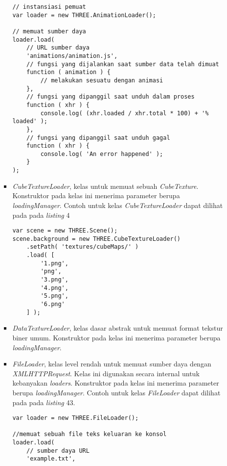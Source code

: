 \documentclass[a4paper,twoside]{article}
\begin{document}
\begin{enumerate}
\begin{itemize}
\begin{itemize}
\begin{lstlisting}[caption={Contoh penggunaan kelas {\it AnimationLoader}.},captionpos=b]
// instansiasi pemuat
var loader = new THREE.AnimationLoader();

// memuat sumber daya
loader.load(
	// URL sumber daya
	'animations/animation.js',
	// fungsi yang dijalankan saat sumber data telah dimuat
	function ( animation ) {
		// melakukan sesuatu dengan animasi
	},
	// fungsi yang dipanggil saat unduh dalam proses
	function ( xhr ) {
		console.log( (xhr.loaded / xhr.total * 100) + '% loaded' );
	},
	// fungsi yang dipanggil saat unduh gagal
	function ( xhr ) {
		console.log( 'An error happened' );
	}
);
\end{lstlisting}

	\item {\it CubeTextureLoader}, kelas untuk memuat sebuah {\it CubeTexture}. Konstruktor pada kelas ini menerima parameter berupa  {\it loadingManager}. Contoh untuk kelas {\it CubeTextureLoader} dapat dilihat pada pada {\it listing} 4
	
\begin{lstlisting}[caption={Contoh penggunaan kelas {\it CubeTextureLoader} menggunakan gambar dengan format PNG di setiap sisinya.},captionpos=b]
var scene = new THREE.Scene();
scene.background = new THREE.CubeTextureLoader()
	.setPath( 'textures/cubeMaps/' )
	.load( [
		'1.png',
		'png',
		'3.png',
		'4.png',
		'5.png',
		'6.png'
	] );
\end{lstlisting}

	\item {\it DataTextureLoader}, kelas dasar abstrak untuk memuat format tekstur biner umum. Konstruktor pada kelas ini menerima parameter berupa  {\it loadingManager}.
	
	\item {\it FileLoader}, kelas level rendah untuk memuat sumber daya dengan {\it XMLHTTPRequest}. Kelas ini digunakan secara internal untuk kebanyakan {\it loaders}. Konstruktor pada kelas ini menerima parameter berupa  {\it loadingManager}. Contoh untuk kelas {\it FileLoader} dapat dilihat pada pada {\it listing} 43.
	
\begin{lstlisting}[caption={Contoh penggunaan kelas {\it FileLoader} untuk berkas dengan format TXT.},captionpos=b]
var loader = new THREE.FileLoader();

//memuat sebuah file teks keluaran ke konsol
loader.load(
    // sumber daya URL
    'example.txt',


\end{lstlisting}
\end{itemize}
\end{itemize}
\end{enumerate}
\end{document}
